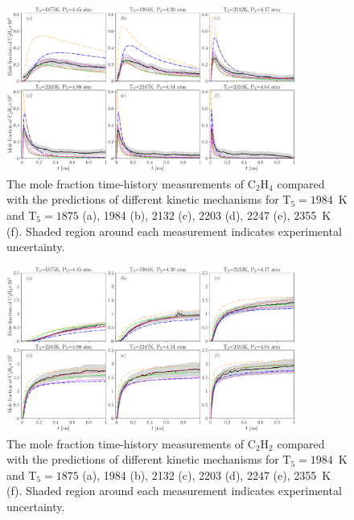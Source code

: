\begin{figure}[H]
	\centering
	\includegraphics[width=0.85\textwidth]{Figures/C2H4_all.pdf}
	\caption{The mole fraction time-history measurements of $\mathrm{C_2H_4}$ compared with the predictions of different kinetic mechanisms for $\mathrm{T_5}=1984$~K and $\mathrm{T_5}=1875$ (a), 1984 (b), 2132 (c), 2203 (d), 2247 (e), 2355~K (f). Shaded region around each measurement indicates experimental uncertainty.}
	\label{fig:c2h4_all} 
\end{figure}

\begin{figure}[H]
	\centering
	\includegraphics[width=0.85\textwidth]{Figures/C2H2_all.pdf}
	\caption{The mole fraction time-history measurements of $\mathrm{C_2H_2}$ compared with the predictions of different kinetic mechanisms for $\mathrm{T_5}=1984$~K and $\mathrm{T_5}=1875$ (a), 1984 (b), 2132 (c), 2203 (d), 2247 (e), 2355~K (f). Shaded region around each measurement indicates experimental uncertainty.}
	\label{fig:c2h2_all} 
\end{figure}


